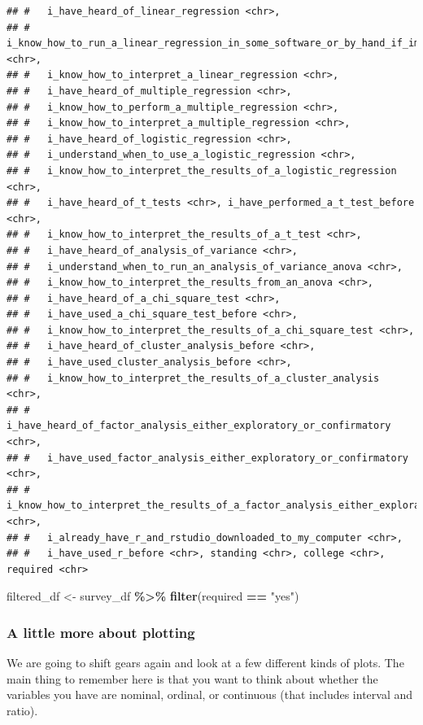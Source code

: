 \documentclass[
]{book}
\newenvironment{Shaded}{\begin{snugshade}}{\end{snugshade}}
\newcommand{\KeywordTok}[1]{\textcolor[rgb]{0.13,0.29,0.53}{\textbf{#1}}}
\newcommand{\NormalTok}[1]{#1}
\newcommand{\OperatorTok}[1]{\textcolor[rgb]{0.81,0.36,0.00}{\textbf{#1}}}
\newcommand{\StringTok}[1]{\textcolor[rgb]{0.31,0.60,0.02}{#1}}
\begin{document}
\begin{verbatim}
## #   i_have_heard_of_linear_regression <chr>,
## #   i_know_how_to_run_a_linear_regression_in_some_software_or_by_hand_if_im_feeling_wild <chr>,
## #   i_know_how_to_interpret_a_linear_regression <chr>,
## #   i_have_heard_of_multiple_regression <chr>,
## #   i_know_how_to_perform_a_multiple_regression <chr>,
## #   i_know_how_to_interpret_a_multiple_regression <chr>,
## #   i_have_heard_of_logistic_regression <chr>,
## #   i_understand_when_to_use_a_logistic_regression <chr>,
## #   i_know_how_to_interpret_the_results_of_a_logistic_regression <chr>,
## #   i_have_heard_of_t_tests <chr>, i_have_performed_a_t_test_before <chr>,
## #   i_know_how_to_interpret_the_results_of_a_t_test <chr>,
## #   i_have_heard_of_analysis_of_variance <chr>,
## #   i_understand_when_to_run_an_analysis_of_variance_anova <chr>,
## #   i_know_how_to_interpret_the_results_from_an_anova <chr>,
## #   i_have_heard_of_a_chi_square_test <chr>,
## #   i_have_used_a_chi_square_test_before <chr>,
## #   i_know_how_to_interpret_the_results_of_a_chi_square_test <chr>,
## #   i_have_heard_of_cluster_analysis_before <chr>,
## #   i_have_used_cluster_analysis_before <chr>,
## #   i_know_how_to_interpret_the_results_of_a_cluster_analysis <chr>,
## #   i_have_heard_of_factor_analysis_either_exploratory_or_confirmatory <chr>,
## #   i_have_used_factor_analysis_either_exploratory_or_confirmatory <chr>,
## #   i_know_how_to_interpret_the_results_of_a_factor_analysis_either_exploratory_or_confirmatory <chr>,
## #   i_already_have_r_and_rstudio_downloaded_to_my_computer <chr>,
## #   i_have_used_r_before <chr>, standing <chr>, college <chr>, required <chr>
\end{verbatim}

\begin{Shaded}
\begin{Highlighting}[]
\NormalTok{filtered\_df \textless{}{-}}\StringTok{ }\NormalTok{survey\_df }\OperatorTok{\%\textgreater{}\%}\StringTok{ }\KeywordTok{filter}\NormalTok{(required }\OperatorTok{==}\StringTok{ "yes"}\NormalTok{)}
\end{Highlighting}
\end{Shaded}

\hypertarget{a-little-more-about-plotting}{%
\subsubsection{A little more about plotting}\label{a-little-more-about-plotting}}

We are going to shift gears again and look at a few different kinds of plots. The main thing to remember here is that you want to think about whether the variables you have are nominal, ordinal, or continuous (that includes interval and ratio).
\end{document}
